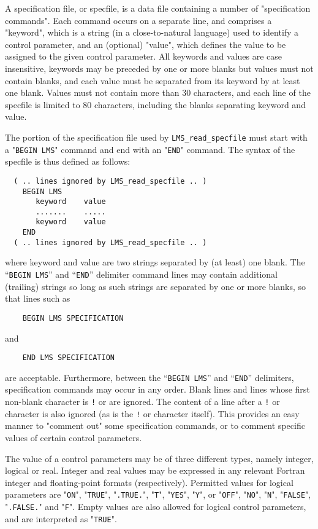 \documentclass{galahad}
\newcommand{\packagename}{LMS}
\begin{document}
A specification file, or specfile, is a data file containing a number of
"specification commands". Each command occurs on a separate line,
and comprises a "keyword",
which is a string (in a close-to-natural language) used to identify a
control parameter, and
an (optional) "value", which defines the value to be assigned to the given
control parameter. All keywords and values are case insensitive,
keywords may be preceded by one or more blanks but
values must not contain blanks, and
each value must be separated from its keyword by at least one blank.
Values must not contain more than 30 characters, and
each line of the specfile is limited to 80 characters,
including the blanks separating keyword and value.

The portion of the specification file used by
{\tt \packagename\_read\_specfile}
must start
with a "{\tt BEGIN \packagename}" command and end with an
"{\tt END}" command.  The syntax of the specfile is thus defined as follows:
\begin{verbatim}
  ( .. lines ignored by LMS_read_specfile .. )
    BEGIN LMS
       keyword    value
       .......    .....
       keyword    value
    END
  ( .. lines ignored by LMS_read_specfile .. )
\end{verbatim}
where keyword and value are two strings separated by (at least) one blank.
The ``{\tt BEGIN \packagename}'' and ``{\tt END}'' delimiter command lines
may contain additional (trailing) strings so long as such strings are
separated by one or more blanks, so that lines such as
\begin{verbatim}
    BEGIN LMS SPECIFICATION
\end{verbatim}
and
\begin{verbatim}
    END LMS SPECIFICATION
\end{verbatim}
are acceptable. Furthermore,
between the
``{\tt BEGIN \packagename}'' and ``{\tt END}'' delimiters,
specification commands may occur in any order.  Blank lines and
lines whose first non-blank character is {\tt !} or {\tt *} are ignored.
The content
of a line after a {\tt !} or {\tt *} character is also
ignored (as is the {\tt !} or {\tt *}
character itself). This provides an easy manner to "comment out" some
specification commands, or to comment specific values
of certain control parameters.

The value of a control parameters may be of three different types, namely
integer, logical or real.
Integer and real values may be expressed in any relevant Fortran integer and
floating-point formats (respectively). Permitted values for logical
parameters are "{\tt ON}", "{\tt TRUE}", "{\tt .TRUE.}", "{\tt T}",
"{\tt YES}", "{\tt Y}", or "{\tt OFF}", "{\tt NO}",
"{\tt N}", "{\tt FALSE}", "{\tt .FALSE.}" and "{\tt F}".
Empty values are also allowed for
logical control parameters, and are interpreted as "{\tt TRUE}".
\end{document}
